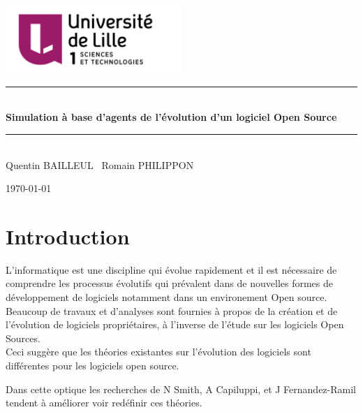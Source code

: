 \documentclass{article}
\newcommand{\HRule}{\rule{\linewidth}{0.5mm}}
\begin{document}
\begin{titlepage}
\begin{center}

\includegraphics[width=0.5\textwidth]{pictures/ul.png}~\\[1cm]

\HRule \\[0.2cm]
{ \huge \bfseries Simulation à base d'agents de l'évolution d'un
  logiciel Open Source \\[0.4cm] }

\HRule \\[1.5cm]
Quentin BAILLEUL \  Romain PHILIPPON

\vfill

{\large \today}

\end{center}
\end{titlepage}

\newpage
\tableofcontents

\newpage

\section{Introduction}
L'informatique est une discipline qui évolue rapidement et
il est nécessaire de comprendre
les processus évolutifs qui prévalent dans de nouvelles formes de
développement de logiciels notamment dans un environement Open source.
\\

Beaucoup de travaux et d'analyses sont fournies à propos de la
création et de l'évolution de logiciels propriétaires, à l'inverse de
l'étude sur les logiciels Open Sources. 
\\

Ceci suggère que les théories existantes sur l'évolution des logiciels
sont différentes pour les logiciels open source.

Dans cette optique les recherches de N Smith, A Capiluppi, et
J Fernandez-Ramil tendent à améliorer voir redéfinir ces théories.
\\
\end{document}

